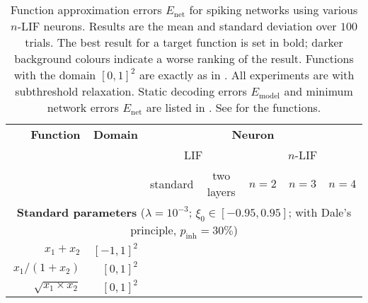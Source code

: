 \begin{table}
\centering\vspace{0.5cm}
\caption[Function approximation errors for spiking networks using various $n$-LIF neurons]{Function approximation errors $E_\mathrm{net}$ for spiking networks using various $n$-LIF neurons.
Results are the mean and standard deviation over $100$ trials.
The best result for a target function is set in bold; darker background colours indicate a worse ranking of the result.
Functions with the domain $[0, 1]^2$ are exactly as in .
All experiments are with subthreshold relaxation.
Static decoding errors $E_\mathrm{model}$ and minimum network errors $E_\mathrm{net}$ are listed in .
See  for the functions.
}
\label{tbl:function_approximations_nlif}
\fontsize{10pt}{12pt}\selectfont
\setlength{\tabcolsep}{10pt}
\renewcommand\arraystretch{1.15}
\sffamily
\begin{tabular}{r r r r r r r }
\toprule
\textbf{Function} & \textbf{Domain} & \multicolumn{5}{c}{\textbf{Neuron}} \\
\cmidrule(r){1-1}\cmidrule(r){2-2}\cmidrule{3-7}
&
&	 \multicolumn{2}{c}{LIF}
&	 \multicolumn{3}{c}{$n$-LIF}
\\
\cmidrule(r){3-4}\cmidrule{5-7}
&
&	 \multicolumn{1}{c}{standard}
&	 \multicolumn{1}{c}{two layers}
&	 \multicolumn{1}{c}{$n = 2$}
&	 \multicolumn{1}{c}{$n = 3$}
&	 \multicolumn{1}{c}{$n = 4$}
\\
\midrule
\multicolumn{7}{c}{\textbf{Standard parameters} ($\lambda = 10^{-3}$; $\xi_0 \in [-0.95, 0.95]$; with Dale's principle, $p_\mathrm{inh} = 30\%$)} \\
\midrule
$x_1 + x_2$
& $[-1, 1]^2$
& \cellcolor{White!80!SteelBlue}{$4.1 \pm 0.2 \%$}
& \cellcolor{White!20!SteelBlue}{$9.3 \pm 0.5 \%$}
& \cellcolor{White!100!SteelBlue}{$\mathbf{3.6 \pm 0.2 \%}$}
& \cellcolor{White!60!SteelBlue}{$5.4 \pm 0.6 \%$}
& \cellcolor{White!40!SteelBlue}{$7.3 \pm 1.2 \%$}
\\
$x_1 / (1 + x_2)$
& $[0, 1]^2$
& \cellcolor{White!60!SteelBlue}{$9.0 \pm 0.7 \%$}
& \cellcolor{White!40!SteelBlue}{$9.6 \pm 0.8 \%$}
& \cellcolor{White!100!SteelBlue}{$\mathbf{4.6 \pm 0.5 \%}$}
& \cellcolor{White!80!SteelBlue}{$8.0 \pm 1.9 \%$}
& \cellcolor{White!20!SteelBlue}{$10.4 \pm 2.7 \%$}
\\
$\sqrt{x_1 \times x_2}$
& $[0, 1]^2$
& \cellcolor{White!20!SteelBlue}{$14.7 \pm 1.4 \%$}
& \cellcolor{White!40!SteelBlue}{$12.0 \pm 1.0 \%$}

\end{tabular}
\end{table}
